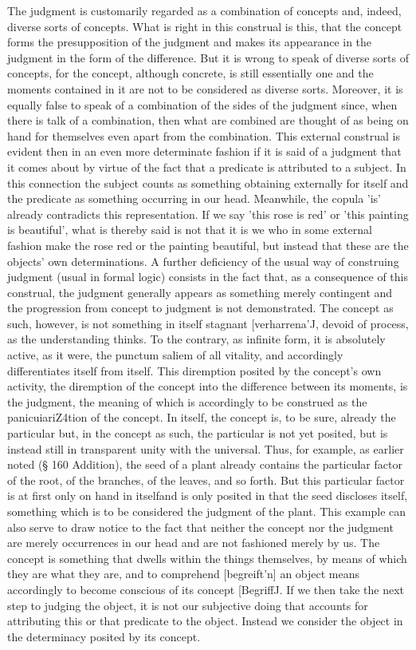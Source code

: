 The judgment is customarily regarded as
a combination of concepts and, indeed, diverse sorts of concepts.
What is right in this construal is this,
that the concept forms the presupposition of the judgment and
makes its appearance in the judgment in the form of the difference.
But it is wrong to speak of diverse sorts of concepts,
for the concept, although concrete, is still essentially one and
the moments contained in it are not to be considered as diverse sorts.
Moreover, it is equally false to speak of a combination of
the sides of the judgment since, when there is talk of a combination,
then what are combined are thought of as being on hand for themselves
even apart from the combination.
This external construal is evident then in an even more determinate fashion if it is said of a
judgment that it comes about by virtue of the fact that a predicate is attributed to
a subject.
In this connection the subject counts as something obtaining externally
for itself and the predicate as something occurring in our head.
Meanwhile, the copula 'is' already contradicts this representation.
If we say 'this rose is red' or 'this painting is beautiful',
what is thereby said is not that it is we who in some external
fashion make the rose red or the painting beautiful,
but instead that these are the objects' own determinations.
A further deficiency of the usual way of construing
judgment (usual in formal logic) consists in the fact that, as a consequence of this
construal, the judgment generally appears as something merely contingent and the
progression from concept to judgment is not demonstrated. The concept as such,
however, is not something in itself stagnant [verharrena'J, devoid of process, as the
understanding thinks. To the contrary, as infinite form, it is absolutely active, as
it were, the punctum saliem of all vitality, and accordingly differentiates itself from
itself. This diremption posited by the concept's own activity, the diremption of the
concept into the difference between its moments, is the judgment, the meaning
of which is accordingly to be construed as the panicuiariZ4tion of the concept.
In itself, the concept is, to be sure, already the particular but, in the concept as
such, the particular is not yet posited, but is instead still in transparent unity with
the universal. Thus, for example, as earlier noted (§ 160 Addition), the seed of
a plant already contains the particular factor of the root, of the branches, of the
leaves, and so forth. But this particular factor is at first only on hand in itselfand is
only posited in that the seed discloses itself, something which is to be considered
the judgment of the plant. This example can also serve to draw notice to the
fact that neither the concept nor the judgment are merely occurrences in our
head and are not fashioned merely by us. The concept is something that dwells
within the things themselves, by means of which they are what they are, and to
comprehend [begreift'n] an object means accordingly to become conscious of its
concept [BegriffJ. If we then take the next step to judging the object, it is not our
subjective doing that accounts for attributing this or that predicate to the object.
Instead we consider the object in the determinacy posited by its concept.

